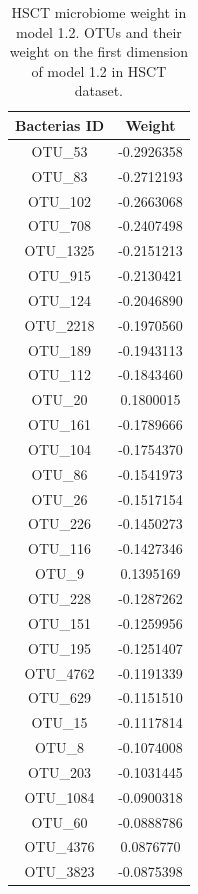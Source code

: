 \documentclass[
  12pt,
  a4paper,
  twoside,
  openright]{book}
\begin{document}
\begin{longtable}[t]{cc}
\caption[HSCT microbiome weight in model 1.2]{\label{tab:hsct-microbiome-1-2}HSCT microbiome weight in model 1.2. OTUs and their weight on the first dimension of model 1.2 in HSCT dataset.}\\
\toprule
Bacterias ID & Weight\\
\midrule
OTU\_53 & -0.2926358\\
OTU\_83 & -0.2712193\\
OTU\_102 & -0.2663068\\
OTU\_708 & -0.2407498\\
OTU\_1325 & -0.2151213\\
\addlinespace
OTU\_915 & -0.2130421\\
OTU\_124 & -0.2046890\\
OTU\_2218 & -0.1970560\\
OTU\_189 & -0.1943113\\
OTU\_112 & -0.1843460\\
\addlinespace
OTU\_20 & 0.1800015\\
OTU\_161 & -0.1789666\\
OTU\_104 & -0.1754370\\
OTU\_86 & -0.1541973\\
OTU\_26 & -0.1517154\\
\addlinespace
OTU\_226 & -0.1450273\\
OTU\_116 & -0.1427346\\
OTU\_9 & 0.1395169\\
OTU\_228 & -0.1287262\\
OTU\_151 & -0.1259956\\
\addlinespace
OTU\_195 & -0.1251407\\
OTU\_4762 & -0.1191339\\
OTU\_629 & -0.1151510\\
OTU\_15 & -0.1117814\\
OTU\_8 & -0.1074008\\
\addlinespace
OTU\_203 & -0.1031445\\
OTU\_1084 & -0.0900318\\
OTU\_60 & -0.0888786\\
OTU\_4376 & 0.0876770\\
OTU\_3823 & -0.0875398\\
\bottomrule
\end{longtable}
\end{document}
